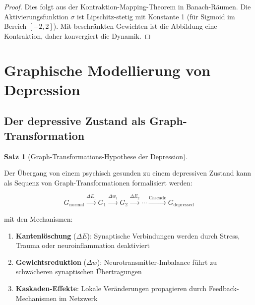 \documentclass[a4paper,12pt]{article}
\theoremstyle{definition}
\newtheorem{satz}{Satz}
\begin{document}
\begin{proof}
Dies folgt aus der Kontraktion-Mapping-Theorem in Banach-Räumen. Die Aktivierungsfunktion $\sigma$ ist Lipschitz-stetig mit Konstante 1 (für Sigmoid im Bereich $[-2, 2]$). Mit beschränkten Gewichten ist die Abbildung eine Kontraktion, daher konvergiert die Dynamik.
\end{proof}

\section{Graphische Modellierung von Depression}

\subsection{Der depressive Zustand als Graph-Transformation}

\begin{satz}[Graph-Transformations-Hypothese der Depression]
\label{satz:transformation}

Der Übergang von einem psychisch gesunden zu einem depressiven Zustand kann als Sequenz von Graph-Transformationen formalisiert werden:

\[
G_{\text{normal}} \xrightarrow{\Delta E_1} G_1 \xrightarrow{\Delta w_1} G_2 \xrightarrow{\Delta E_2} \cdots \xrightarrow{\text{Cascade}} G_{\text{depressed}}
\]

mit den Mechanismen:
\begin{enumerate}
	\item \textbf{Kantenlöschung} ($\Delta E$): Synaptische Verbindungen werden durch Stress, Trauma oder neuroinflammation deaktiviert
	\item \textbf{Gewichtsreduktion} ($\Delta w$): Neurotransmitter-Imbalance führt zu schwächeren synaptischen Übertragungen
	\item \textbf{Kaskaden-Effekte}: Lokale Veränderungen propagieren durch Feedback-Mechanismen im Netzwerk
\end{enumerate}

\end{satz}
\end{document}
